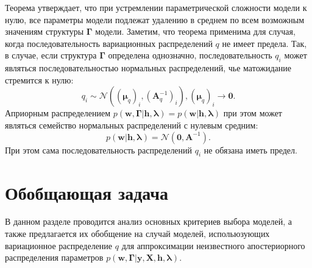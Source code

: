 Теорема утверждает, что при устремлении параметрической сложности модели к нулю, все параметры модели подлежат удалению в среднем по всем возможным значениям  структуры $\boldsymbol{\Gamma}$ модели. Заметим, что теорема применима для случая, когда последовательность вариационных распределений $q$ не имеет предела. Так, в случае, если структура $\boldsymbol{\Gamma}$ определена однозначно, последовательность $q_i$ может являться последовательностью нормальных распределений, чье матожидание стремится к нулю:
\[
    q_i \sim \mathcal{N}((\boldsymbol{\mu}_q)_i, (\mathbf{A}^{-1}_q)_i), (\boldsymbol{\mu}_q)_i \to \mathbf{0}.
\]
Априорным распределением $p(\mathbf{w},\boldsymbol{\Gamma}|\mathbf{h},\boldsymbol{\lambda}) = p(\mathbf{w}|\mathbf{h},\boldsymbol{\lambda})$ при этом может являться семейство нормальных распределений с нулевым средним:
\[
    p(\mathbf{w}|\mathbf{h},\boldsymbol{\lambda}) = \mathcal{N}(\mathbf{0}, \mathbf{A}^{-1}).
\]
При этом сама последовательность распределений $q_i$ не обязана иметь предел.

\section{Обобщающая задача}
В данном разделе проводится анализ основных критериев выбора моделей, а также предлагается их обобщение на случай моделей, испольюзующих вариационное распределение $q$ для аппроксимации неизвестного апостериорного распределения параметров $p(\mathbf{w}, \boldsymbol{\Gamma}|\mathbf{y}, \mathbf{X}, \mathbf{h}, \boldsymbol{\lambda})$.

